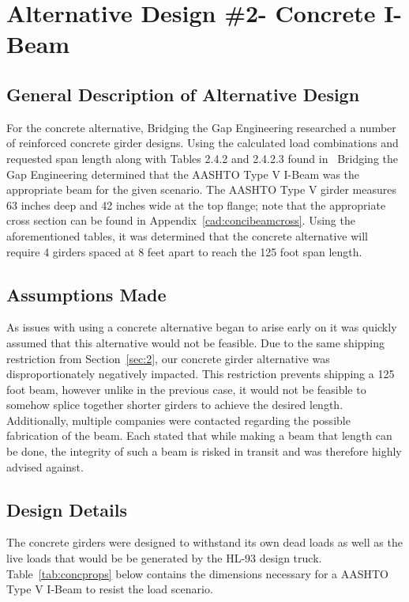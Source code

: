 \chapter{Alternative Design \#2- Concrete I-Beam}

\section{General Description of Alternative Design}
For the concrete alternative, Bridging the Gap Engineering researched a number of reinforced concrete girder designs. Using the calculated load combinations and requested span length along with Tables 2.4.2 and 2.4.2.3 found in~\cite{bridgedesignman} Bridging the Gap Engineering determined that the AASHTO Type V I-Beam was the appropriate beam for the given scenario. The AASHTO Type V girder measures 63 inches deep and 42 inches wide at the top flange; note that the appropriate cross section can be found in Appendix~\ref{cad:concibeamcross}.  Using the aforementioned tables, it was determined that the concrete alternative will require 4 girders spaced at 8 feet apart to reach the 125 foot span length.

\section{Assumptions Made}

As issues with using a concrete alternative began to arise early on it was quickly assumed that this alternative would not be feasible. Due to the same shipping restriction from Section~\ref{sec:2}, our concrete girder alternative was disproportionately negatively impacted. This restriction prevents shipping a 125 foot beam, however unlike in the previous case, it would not be feasible to somehow splice together shorter girders to achieve the desired length. Additionally, multiple companies were contacted regarding the possible fabrication of the beam. Each stated that while making a beam that length can be done, the integrity of such a beam is risked in transit and was therefore highly advised against.

\section{Design Details}

The concrete girders were designed to withstand its own dead loads as well as the live loads that would be be generated by the HL-93 design truck. Table~\ref{tab:concprops} below contains the dimensions necessary for a AASHTO Type V I-Beam to resist the load scenario.

